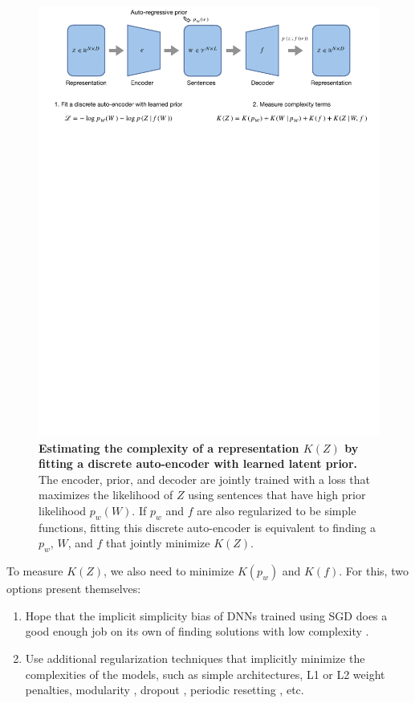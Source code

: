 \documentclass{article}
\begin{document}
\begin{appendices}
\begin{figure}[ht]
    \centering
    \includegraphics[width=\linewidth]{figures/optimization.pdf}
    \caption{\textbf{Estimating the complexity of a representation $K(Z)$ by fitting a discrete auto-encoder with learned latent prior.} The encoder, prior, and decoder are jointly trained with a loss that maximizes the likelihood of $Z$ using sentences that have high prior likelihood $p_w(W)$. If $p_w$ and $f$ are also regularized to be simple functions, fitting this discrete auto-encoder is equivalent to finding a $p_w$, $W$, and $f$ that jointly minimize $K(Z)$.}
    \label{fig:optimization}
\end{figure}

To measure $K(Z)$, we also need to minimize $K(p_w)$ and $K(f)$. For this, two options present themselves:
\begin{enumerate}
    \item Hope that the implicit simplicity bias of DNNs trained using SGD does a good enough job on its own of finding solutions with low complexity \citep{blier2018description}.
    \item Use additional regularization techniques that implicitly minimize the complexities of the models, such as simple architectures, L1 or L2 weight penalties, modularity \citep{goyal2022inductive}, dropout \citep{hinton2012improving}, periodic resetting \cite{zhou2021fortuitous}, etc.
\end{enumerate}


\end{appendices}
\end{document}
